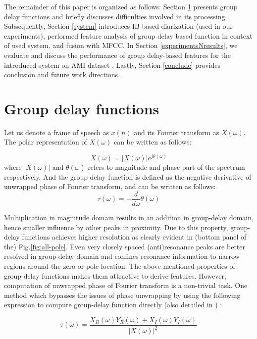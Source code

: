 \documentclass[conference]{IEEEtran}
\begin{document}
The remainder of this paper is organized as follows: Section \ref{fe} presents group delay functions and briefly discusses difficulties involved in its processing. Subsequently, Section \ref{system} introduces IB based diarization (used in our experiments), performed feature analysis of group delay based function in context of used system, and fusion with MFCC. In Section \ref{experimentsNresults}, we evaluate and discuss the performance of group delay-based features for the introduced system on AMI dataset \cite{AMIData}. Lastly, Section \ref{conclude} provides conclusion and future work directions.    

\section{Group delay functions}
\label{fe}
Let us denote a frame of speech as $x(n)$ and its Fourier transform as $X(\omega)$. The polar representation of $X(\omega)$ can be written as follows:

\begin{equation}
X(\omega) = |X(\omega)| e^{j\theta(\omega)} 
\label{equ:FT}
\end{equation}     
where $|X(\omega)|$ and $\theta(\omega)$ refers to magnitude and phase part of the spectrum respectively. And the group-delay function is defined as the negative derivative of unwrapped phase of Fourier transform, and can be written as follows: 
\begin{equation}
\tau(\omega) =  - \frac{d}{d\omega} \theta(\omega)
\label{equ:GDF_def}
\end{equation}

Multiplication in magnitude domain results in an addition in group-delay domain, hence smaller influence by other peaks in proximity. Due to this property, group-delay functions achieves higher resolution as clearly evident in (bottom panel of the) Fig.\ref{fig:all-pole}. Even very closely spaced (anti)resonance peaks are better resolved in group-delay domain and confines resonance information to narrow regions around the zero or pole location. The above mentioned properties of group-delay functions makes them attractive to derive features. However, computation of unwrapped phase of Fourier transform is a non-trivial task. One method which bypasses the issues of phase unwrapping by using the following expression to compute group-delay function directly (also detailed in \cite{gdSurvey}) :

\begin{equation}
\tau(\omega) = \frac{X_R(\omega)Y_R(\omega) + X_I(\omega)Y_I(\omega)}{|X(\omega)|^{2}}
\label{eq:GDF_com}
\end{equation}
\end{document}
